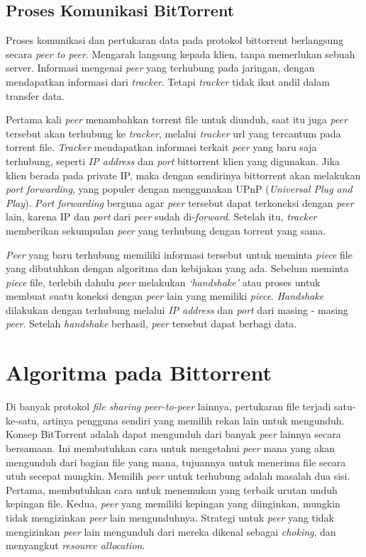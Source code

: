 \subsection{Proses Komunikasi BitTorrent}

Proses komunikasi dan pertukaran data pada protokol bittorrent berlangsung secara \emph{peer to peer}. Mengarah langsung kepada klien, tanpa memerlukan sebuah server. Informasi mengenai \emph{peer} yang terhubung pada jaringan, dengan mendapatkan informasi dari \emph{tracker}. Tetapi \emph{tracker} tidak ikut andil dalam transfer data.
	
Pertama kali \emph{peer} menambahkan torrent file untuk diunduh, saat itu juga \emph{peer} tersebut akan terhubung ke \emph{tracker}, melalui \emph{tracker} url yang tercantum pada torrent file. \emph{Tracker} mendapatkan informasi terkait \emph{peer} yang baru saja terhubung, seperti \emph{IP address} dan \emph{port} bittorrent klien yang digunakan. Jika klien berada pada private IP, maka dengan sendirinya bittorrent akan melakukan \emph{port forwarding}, yang populer dengan menggunakan UPnP (\emph{Universal Plug and Play}). \emph{Port forwarding} berguna agar \emph{peer} tersebut dapat terkoneksi dengan \emph{peer} lain, karena IP dan \emph{port} dari \emph{peer} sudah di-\emph{forward}. Setelah itu, \emph{tracker} memberikan sekumpulan \emph{peer} yang terhubung dengan torrent yang sama. 

\emph{Peer} yang baru terhubung memiliki informasi tersebut untuk meminta \emph{piece} file yang dibutuhkan dengan algoritma dan kebijakan yang ada. Sebelum meminta \emph{piece} file, terlebih dahulu \emph{peer} melakukan \emph{`handshake'} atau proses untuk membuat suatu koneksi dengan \emph{peer} lain yang memiliki \emph{piece}. \emph{Handshake} dilakukan dengan terhubung melalui \emph{IP address} dan \emph{port} dari masing - masing \emph{peer}. Setelah \emph{handshake} berhasil, \emph{peer} tersebut dapat berbagi data.

\section{Algoritma pada Bittorrent}

Di banyak protokol \emph{file sharing peer-to-peer} lainnya, pertukaran file terjadi satu-ke-satu, artinya pengguna sendiri yang memilih rekan lain untuk mengunduh. Konsep BitTorrent adalah dapat mengunduh dari banyak \emph{peer} lainnya secara bersamaan. Ini membutuhkan cara untuk mengetahui \emph{peer} mana yang akan mengunduh dari bagian file yang mana, tujuannya untuk menerima file secara utuh secepat mungkin. Memilih \emph{peer} untuk terhubung adalah masalah dua sisi. Pertama, membutuhkan cara untuk menemukan yang terbaik urutan unduh kepingan file. Kedua, \emph{peer} yang memiliki kepingan yang diinginkan, mungkin tidak mengizinkan \emph{peer} lain mengunduhnya. Strategi untuk \emph{peer} yang tidak mengizinkan \emph{peer} lain mengunduh dari mereka dikenal sebagai \emph{choking}, dan menyangkut \emph{resource allocation}.

